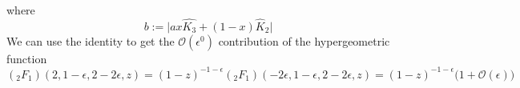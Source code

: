 where 
\begin{equation*}
b := \big| ax \hat{K_3} + (1-x)\hat{K}_2\big|
\end{equation*}
We can use the identity to get the $\mathcal{O}(\epsilon^{0})$ contribution of the hypergeometric function
\begin{equation*}
(_2F_1)(2,1-\epsilon, 2-2\epsilon, z) = (1-z)^{-1-\epsilon}(_2F_1)(-2\epsilon, 1-\epsilon, 2-2\epsilon, z)
=(1-z)^{-1-\epsilon}\big(1+\mathcal{O}(\epsilon)\big)
\end{equation*}

\color{black}


